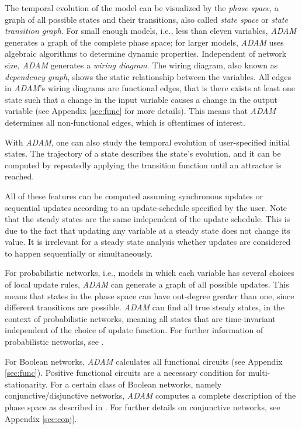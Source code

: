 \documentclass[10pt]{bmc_article}
\newenvironment{bmcformat}{\fussy\setboolean{publ}{true}}{\fussy}
\begin{document}
\begin{bmcformat}
The temporal evolution of the model can be visualized by the {\it phase
space}, a graph of all possible states and their transitions, also called {\it state space} or {\it state transition graph}. For small enough
models, i.e., less than eleven variables, {\it ADAM} generates a graph of the complete phase space; for larger models, {\it ADAM} uses algebraic algorithms to determine dynamic properties. Independent of
network size, {\it ADAM} generates a {\it wiring diagram}. The wiring diagram, also
known as {\it dependency graph}, shows the static relationship between the
variables. All edges in {\it ADAM}’s wiring diagrams are functional edges, that is
there exists at least one state such that a change in the input variable causes a
change in the output variable (see Appendix \ref{sec:func} for more details).
This means that {\it ADAM} determines all non-functional edges, which is oftentimes
of interest.

With {\it ADAM}, one can also study the temporal evolution of user-specified initial states. The trajectory of a state describes the state's evolution, and it can be computed by repeatedly applying the transition function until an attractor is reached.  

All of these features can be computed assuming synchronous updates or sequential updates according to an update-schedule specified by the user. Note that the steady
states are the same independent of the update schedule. This is due to the
fact that updating any variable at a steady state does not change its value.
It is irrelevant for a steady state analysis whether updates are considered to happen sequentially or simultaneously.

For probabilistic networks, i.e., models in which each variable has several choices of local update rules, {\it ADAM} can generate a graph of all possible updates. This means that states in the phase space can have out-degree greater than one, since different transitions are possible. {\it ADAM} can find all true steady states, in the context of probabilistic networks, meaning all states that are time-invariant independent of the choice of update function. For further information of probabilistic networks, see \cite{shmulevich}.

For Boolean networks, {\it ADAM} calculates all functional circuits (see Appendix \ref{sec:func}). Positive functional circuits are a necessary condition for multi-stationarity. For a certain class of Boolean networks, namely conjunctive/disjunctive networks, {\it ADAM} computes a complete description of the phase space as described in \cite{conjunctive}. For further details on conjunctive networks, see Appendix \ref{sec:conj}.


\end{bmcformat}
\end{document}
